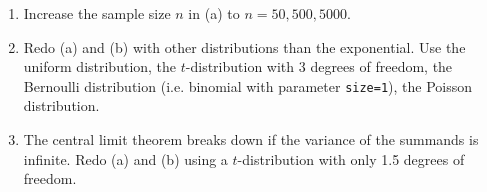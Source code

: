\documentclass{article}
\begin{document}
\begin{enumerate}
\begin{enumerate}
\item Increase the sample size $n$ in (a) to $n=50,500,5000$.

\item Redo (a) and (b) with other distributions than the exponential. Use
the uniform distribution, the $t$-distribution with 3 degrees of freedom,
the Bernoulli distribution (i.e. binomial with parameter \texttt{size=1}),
the Poisson distribution.

\item The central limit theorem breaks down if the variance of the summands
is infinite. Redo (a) and (b) using a $t$-distribution with only 1.5 degrees
of freedom.
\end{enumerate}

%
%
%
%
%
%
%
%
\end{enumerate}
\newpage
\end{document}

